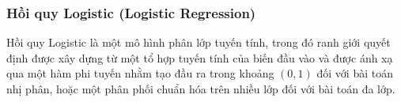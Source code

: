 \subsubsection{Hồi quy Logistic (Logistic Regression)}

Hồi quy Logistic là một mô hình phân lớp tuyến tính, trong đó ranh giới quyết
định được xây dựng từ một tổ hợp tuyến tính của biến đầu vào và được ánh xạ qua
một hàm phi tuyến nhằm tạo đầu ra trong khoảng $(0,1)$ đối với bài toán nhị
phân, hoặc một phân phối chuẩn hóa trên nhiều lớp đối với bài toán đa lớp.






